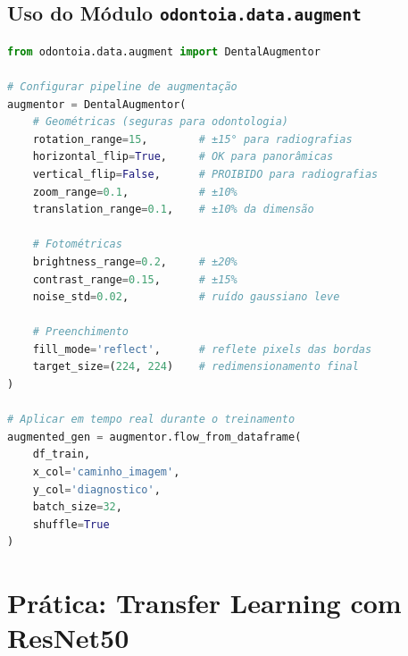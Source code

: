 \subsection{Uso do Módulo \texttt{odontoia.data.augment}}

\begin{lstlisting}[language=Python, caption={Configuração de aumento de dados
odontológico com odontoia.data.augment}, label={lst:augment}]
from odontoia.data.augment import DentalAugmentor

# Configurar pipeline de augmentação
augmentor = DentalAugmentor(
    # Geométricas (seguras para odontologia)
    rotation_range=15,        # ±15° para radiografias
    horizontal_flip=True,     # OK para panorâmicas
    vertical_flip=False,      # PROIBIDO para radiografias
    zoom_range=0.1,           # ±10%
    translation_range=0.1,    # ±10% da dimensão

    # Fotométricas
    brightness_range=0.2,     # ±20%
    contrast_range=0.15,      # ±15%
    noise_std=0.02,           # ruído gaussiano leve

    # Preenchimento
    fill_mode='reflect',      # reflete pixels das bordas
    target_size=(224, 224)    # redimensionamento final
)

# Aplicar em tempo real durante o treinamento
augmented_gen = augmentor.flow_from_dataframe(
    df_train,
    x_col='caminho_imagem',
    y_col='diagnostico',
    batch_size=32,
    shuffle=True
)
\end{lstlisting}


\section{Prática: Transfer Learning com ResNet50}
\label{sec:pratica-resnet50}

\niveltres

